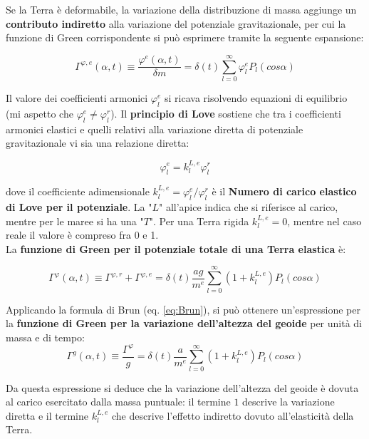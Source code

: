 \documentclass[a4paper,12pt]{book}
\begin{document}
Se la Terra è deformabile, la variazione della distribuzione di massa aggiunge un \textbf{contributo indiretto} alla variazione del potenziale gravitazionale,
per cui la funzione di Green corrispondente si può esprimere tramite la seguente espansione:

\begin{equation}
    \Gamma^{\varphi,e} (\alpha, t) \equiv \frac{\varphi ^e (\alpha, t)}{\delta m} = \delta (t) \sum_{l=0}^\infty \varphi_l^e P_l (cos \alpha)
\end{equation}

\noindent Il valore dei coefficienti armonici $\varphi_l^e$ si ricava risolvendo equazioni di equilibrio (mi aspetto che $\varphi_l^e \neq \varphi_l^r$).
Il \textbf{principio di Love} sostiene che tra i coefficienti armonici elastici e quelli relativi alla variazione diretta di potenziale gravitazionale vi sia una relazione diretta:

\begin{equation}
    \varphi_l^e = k_l^{L,e}\varphi_l^r
\end{equation}

\noindent
dove il coefficiente adimensionale $k_l^{L,e} = \varphi_l^e / \varphi_l^r$ è il \textbf{Numero di carico elastico di Love per il potenziale}.
La "$L$" all'apice indica che si riferisce al carico, mentre per le maree si ha una "$T$".
Per una Terra rigida $k_l^{L,e} = 0$, mentre nel caso reale il valore è compreso fra 0 e 1.\\

\noindent La \textbf{funzione di Green per il potenziale totale di una Terra elastica} è:

\begin{equation}
    \Gamma^\varphi (\alpha, t) \equiv \Gamma^{\varphi,r} + \Gamma^{\varphi,e} = \delta(t) \frac{ag}{m^e} \sum_{l=0}^\infty (1 + k_l^{L,e})P_l(cos\alpha)
\end{equation}


\noindent Applicando la formula di Brun (eq. \ref{eq:Brun}), si può ottenere un'espressione per la \textbf{funzione di Green per la variazione dell'altezza del geoide} per unità di massa e di tempo:
\begin{equation}
    \Gamma^g (\alpha, t) \equiv \frac{\Gamma^\varphi}{g} = \delta (t) \frac{a}{m^e} \sum_{l=0}^\infty (1 + k_l^{L,e})P_l(cos \alpha)
\end{equation}

\noindent
Da questa espressione si deduce che la variazione dell'altezza del geoide è dovuta al carico esercitato dalla massa puntuale:
il termine $1$ descrive la variazione diretta e il termine $k_l^{L,e}$ che descrive l'effetto indiretto dovuto all'elasticità della Terra.\\
\end{document}
